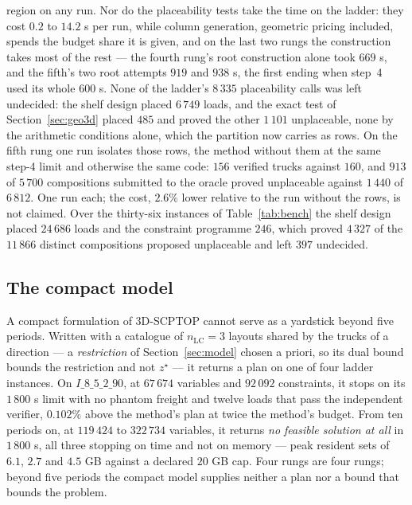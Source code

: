 region on any run. Nor do the placeability tests take the time on the
ladder: they cost $0.2$ to $14.2$ s per run, while column generation,
geometric pricing included, spends the budget share it is given, and on
the last two rungs the construction takes most of the rest --- the
fourth rung's root construction alone took $669$ s, and the fifth's two
root attempts $919$ and $938$ s, the first ending when step~4 used its
whole $600$ s. None of the ladder's $8\,335$ placeability calls was
left undecided: the shelf design placed $6\,749$ loads, and the exact
test of Section~\ref{sec:geo3d} placed $485$ and proved the other
$1\,101$ unplaceable, none by the arithmetic conditions alone, which
the partition now carries as rows. On the fifth rung one run isolates
those rows, the method without them at the same step-4 limit and
otherwise the same code: $156$ verified trucks against $160$, and $913$
of $5\,700$ compositions submitted to the oracle proved unplaceable
against $1\,440$ of $6\,812$. One run each; the cost, $2.6\%$ lower
relative to the run without the rows, is not claimed. Over the
thirty-six instances of Table~\ref{tab:bench} the shelf design placed
$24\,686$ loads and the constraint programme $246$, which proved
$4\,327$ of the $11\,866$ distinct compositions proposed unplaceable
and left $397$ undecided.

\subsection{The compact model}
\label{sec:res-compact}



A compact formulation of 3D-SCPTOP cannot serve as a yardstick beyond
five periods. Written with a catalogue of $n_{\mathrm{LC}}=3$ layouts
shared by the trucks of a direction --- a \emph{restriction} of
Section~\ref{sec:model} chosen a priori, so its dual bound bounds the
restriction and not $z^{\star}$ --- it returns a plan on one of four
ladder instances. On $I\_8\_5\_2\_90$, at $67\,674$ variables and
$92\,092$ constraints, it stops on its $1\,800$ s limit with no phantom
freight and twelve loads that pass the independent verifier,
$0.102\%$ above the method's plan at twice the method's
budget. From ten periods on, at $119\,424$ to $322\,734$ variables, it
returns \emph{no feasible solution at all} in $1\,800$ s, all three
stopping on time and not on memory --- peak resident sets of $6.1$,
$2.7$ and $4.5$ GB against a declared $20$ GB cap. Four rungs are four
rungs; beyond five periods the compact model supplies neither a plan
nor a bound that bounds the problem.

